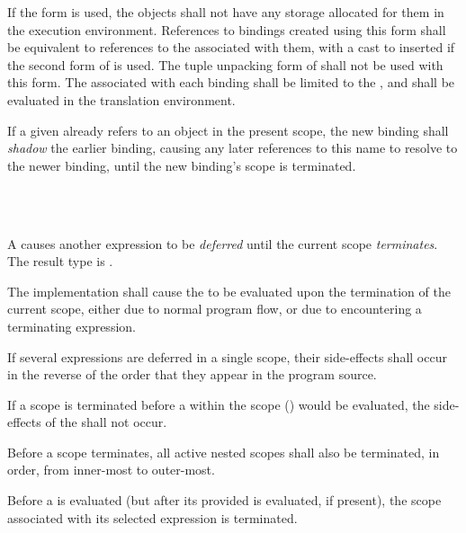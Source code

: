 \specsubsubitem
If the  form is used, the objects shall not have any storage
allocated for them in the execution environment. References to bindings created
using this form shall be equivalent to references to the
 associated with them, with a cast to 
inserted if the second form of  is used. The tuple
unpacking form of  shall not be used with this form. The
 associated with each binding shall be limited to
the , and shall be evaluated in
the translation environment.

\specsubsubitem
If a given  already refers to an object in the present scope,
the new binding shall \textit{shadow} the earlier binding, causing any later
references to this name to resolve to the newer binding, until the new binding's
scope is terminated.


\begin{grammar}
 \\
	  \\
\end{grammar}

\specsubsubitem
A  causes another expression to be
\textit{deferred} until the current scope \textit{terminates}. The result type
is .

\specsubsubitem
The implementation shall cause the  to be evaluated
upon the termination of the current scope, either due to normal program flow,
or due to encountering a terminating expression.

\specsubsubitem
If several expressions are deferred in a single scope, their side-effects shall
occur in the reverse of the order that they appear in the program source.

\specsubsubitem
If a scope is terminated before a  within the
scope () would be
evaluated, the side-effects of the  shall not occur.

\specsubsubitem
Before a scope terminates, all active nested scopes shall also be terminated, in
order, from inner-most to outer-most.

\specsubsubitem
Before a  is evaluated (but after its provided
 is evaluated, if present), the scope associated with
its selected expression is terminated.

